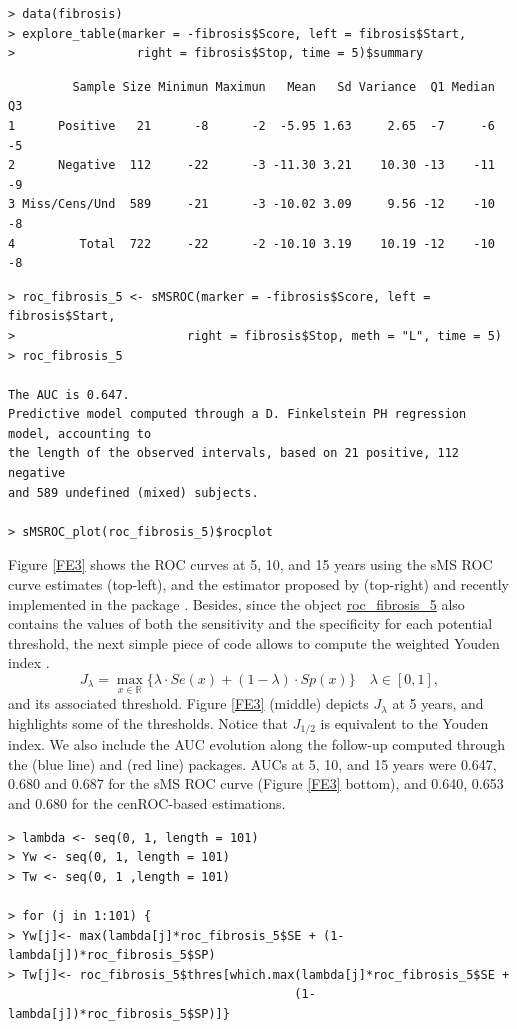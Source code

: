 \begin{verbatim}
> data(fibrosis)
> explore_table(marker = -fibrosis$Score, left = fibrosis$Start,
>                 right = fibrosis$Stop, time = 5)$summary
\end{verbatim}

\begin{verbatim}
         Sample Size Minimun Maximun   Mean   Sd Variance  Q1 Median Q3
1      Positive   21      -8      -2  -5.95 1.63     2.65  -7     -6 -5
2      Negative  112     -22      -3 -11.30 3.21    10.30 -13    -11 -9
3 Miss/Cens/Und  589     -21      -3 -10.02 3.09     9.56 -12    -10 -8
4         Total  722     -22      -2 -10.10 3.19    10.19 -12    -10 -8
\end{verbatim}


\begin{verbatim}
> roc_fibrosis_5 <- sMSROC(marker = -fibrosis$Score, left = fibrosis$Start, 
>                        right = fibrosis$Stop, meth = "L", time = 5)
> roc_fibrosis_5

The AUC is 0.647. 
Predictive model computed through a D. Finkelstein PH regression model, accounting to 
the length of the observed intervals, based on 21 positive, 112 negative 
and 589 undefined (mixed) subjects.

> sMSROC_plot(roc_fibrosis_5)$rocplot
\end{verbatim}

Figure \ref{FE3} shows the ROC curves at 5, 10, and 15 years using the sMS ROC curve estimates (top-left), and the estimator proposed by \citet{Kassu2022} (top-right) and recently implemented in the package . Besides, since the object \url{roc_fibrosis_5} also contains the values of both the sensitivity and 
the specificity for each potential threshold, the next simple piece of code allows to compute the weighted Youden index \citep{Pablo2011}. $$J_{\lambda}=\max_{x\in\mathbb R}\{\lambda\cdot Se(x)+ (1-\lambda)\cdot Sp(x)\}\quad \lambda\in [0,1],$$ and its associated threshold. Figure \ref{FE3} (middle) depicts $J_\lambda$ at 5 years, and highlights some of the thresholds. Notice that $J_{1/2}$ is equivalent to the Youden index. We also include the AUC evolution along the follow-up computed through the  (blue line) and  (red line) packages. AUCs at 5, 10, and 15 years were 0.647, 0.680 and 0.687 for the sMS ROC curve (Figure \ref{FE3} bottom), and 0.640, 0.653 and 0.680 for the cenROC-based estimations.  

\begin{verbatim}
> lambda <- seq(0, 1, length = 101)
> Yw <- seq(0, 1, length = 101)
> Tw <- seq(0, 1 ,length = 101)

> for (j in 1:101) {
> Yw[j]<- max(lambda[j]*roc_fibrosis_5$SE + (1-lambda[j])*roc_fibrosis_5$SP)
> Tw[j]<- roc_fibrosis_5$thres[which.max(lambda[j]*roc_fibrosis_5$SE + 
                                        (1-lambda[j])*roc_fibrosis_5$SP)]}
\end{verbatim}

